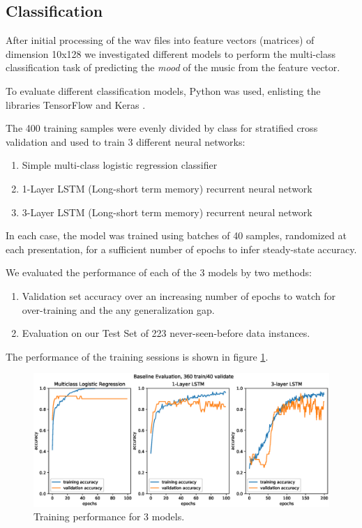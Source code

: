 \documentclass{article}
\begin{document}
\subsection{Classification}

After initial processing of the wav files into feature vectors (matrices) of dimension 10x128 we investigated different models to perform the multi-class classification task of predicting the \textit{mood} of the music from the feature vector.

To evaluate different classification models, Python was used, enlisting the libraries TensorFlow \cite{tensorflow} and Keras \cite{keras}.

The 400 training samples were evenly divided by class for stratified cross validation and used to train 3 different neural networks:
\begin{enumerate}
\item Simple multi-class logistic regression classifier
\item 1-Layer LSTM (Long-short term memory) recurrent neural network
\item 3-Layer LSTM (Long-short term memory) recurrent neural network
\end{enumerate}
In each case, the model was trained using batches of 40 samples, randomized at each presentation, for a sufficient number of epochs to infer steady-state accuracy.

We evaluated the performance of each of the 3 models by two methods:
\begin{enumerate}
\item Validation set accuracy over an increasing number of epochs to watch for over-training and the any generalization gap.
\item Evaluation on our Test Set of 223 never-seen-before data instances.
\end{enumerate}

The performance of the training sessions is shown in figure \ref{fig:baseline_train}.
\begin{figure}[!htb]
	\centering
	\includegraphics[width=1.0\textwidth]{Baseline400.eps}  
	\caption{Training performance for 3 models.}
	\label{fig:baseline_train}
\end{figure}
\end{document}
